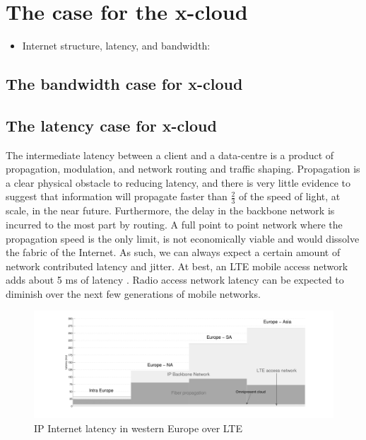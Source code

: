 \documentclass[conference]{IEEEtran}
\newcommand{\xcloud}{x-cloud }
\begin{document}
\section{The case for the \xcloud}

\begin{itemize}
\item Internet structure, latency, and bandwidth: \cite{Ramasubramanian:2009:TIL:2492101.1555357}
\end{itemize}

\subsection{The bandwidth case for \xcloud}

\subsection{The latency case for \xcloud}
The intermediate latency between a client and a data-centre is a product of propagation, modulation, and network routing and traffic shaping. Propagation is a clear physical obstacle to reducing latency, and there is very little evidence to suggest that information will propagate faster than $\frac{2}{3}$ of the speed of light, at scale, in the near future. Furthermore, the delay in the backbone network is incurred to the most part by routing. A full point to point network where the propagation speed is the only limit, is not economically viable and would dissolve the fabric of the Internet. As such, we can always expect a certain amount of network contributed latency and jitter. At best, an LTE mobile access network adds about 5 ms of latency \cite{blajic2006latency}. Radio access network latency can be expected to diminish over the next few generations of mobile networks. 

\begin{figure}[tb]
	\centering
	\includegraphics[height=0.12\paperheight]{omni_motivation.pdf} 
	\caption{IP Internet latency in western Europe \cite{BT_IP} over LTE \cite{blajic2006latency}}
	\label{fig:omni_motivation}
\end{figure}
\end{document}
